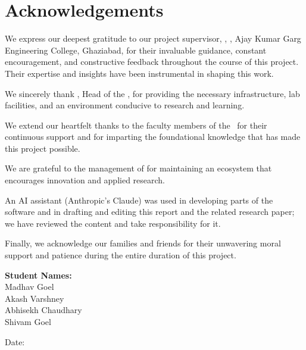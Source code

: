 \chapter*{Acknowledgements}

We express our deepest gratitude to our project supervisor, \textbf{\mentor}, \dept, Ajay Kumar Garg Engineering College, Ghaziabad, for their invaluable guidance, constant encouragement, and constructive feedback throughout the course of this project. Their expertise and insights have been instrumental in shaping this work.

We sincerely thank \textbf{\hod}, Head of the \dept, for providing the necessary infrastructure, lab facilities, and an environment conducive to research and learning.

We extend our heartfelt thanks to the faculty members of the \dept\ for their continuous support and for imparting the foundational knowledge that has made this project possible.

We are grateful to the management of \textbf{\college} for maintaining an ecosystem that encourages innovation and applied research.

An AI assistant (Anthropic's Claude) was used in developing parts of the software and in drafting and editing this report and the related research paper; we have reviewed the content and take responsibility for it.

Finally, we acknowledge our families and friends for their unwavering moral support and patience during the entire duration of this project.

\vspace{2cm}
\noindent\textbf{Student Names:}\\[0.3cm]
Madhav Goel \\
Akash Varshney \\
Abhisekh Chaudhary \\
Shivam Goel

\vspace{0.5cm}
\noindent Date: \submissiondate
